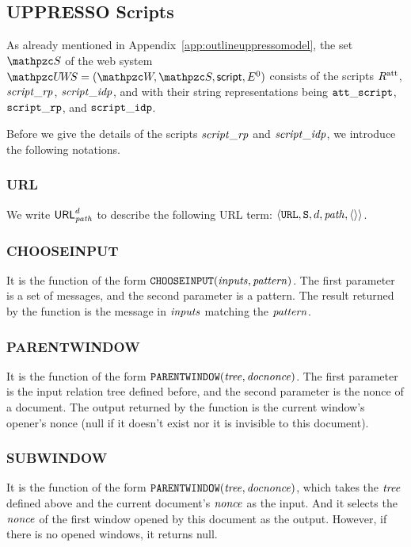   \subsection{UPPRESSO Scripts}\label{app:uppresso-scripts}
  As already mentioned in Appendix~\ref{app:outlineuppressomodel}, the set $\scriptset$ 
  of the web system $\uppressowebsystem=(\bidsystem, \scriptset, \mathsf{script}, E^0)$ 
  consists of the scripts $R^\text{att}$, $\mathit{script\_rp}$, $\mathit{script\_idp}$, and with their 
  string representations being $\mathtt{att\_script}$, $\mathtt{script\_rp}$, and $\mathtt{script\_idp}$. 
  
  Before we give the details of the scripts $\mathit{script\_rp}$ and $\mathit{script\_idp}$, we introduce the following notations.
  
  \subsubsection{URL} We write $\mathsf{URL}^d_{\mathit{path}}$ to describe the following URL term: $\langle\mathtt{URL}, \mathtt{S}, d,  \mathit{path}, \langle\rangle\rangle$.  
  
  \subsubsection{CHOOSEINPUT} It is the function of the form $\mathtt{CHOOSEINPUT}(\mathit{inputs}, \mathit{pattern})$. The first parameter is a set of messages, and the second parameter is a pattern. The result returned by the function is the message in $\mathit{inputs}$ matching the $\mathit{pattern}$.
  
  \subsubsection{PARENTWINDOW} It is the function of the form $\mathtt{PARENTWINDOW}(\mathit{tree}, \mathit{docnonce})$. The first parameter is the input relation tree defined before, and the second parameter is the nonce of a document. The output returned by the function is the current window's opener's nonce (null if it doesn't exist nor it is invisible to this document).
  
  \subsubsection{SUBWINDOW} It is the function of the form $\mathtt{PARENTWINDOW}(\mathit{tree}, \mathit{docnonce})$, which takes the $\mathit{tree}$ defined above and the current document's $\mathit{nonce}$ as the input. And it selects the $\mathit{nonce}$ of the first window opened by this document as the output. However, if there is no opened windows, it returns  null.
  
